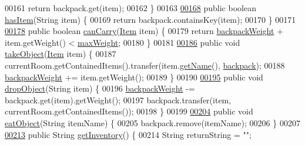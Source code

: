 \begin{DoxyCode}
00161         \textcolor{keywordflow}{return} backpack.get(item);
00162     \}
00163 
\hypertarget{Player_8java_source_l00168}{}\hyperlink{classPlayer_a90cb3f05b491eaed668fe54b9258b755}{00168}     \textcolor{keyword}{public} \textcolor{keywordtype}{boolean} \hyperlink{classPlayer_a90cb3f05b491eaed668fe54b9258b755}{hasItem}(String item) \{
00169         \textcolor{keywordflow}{return} backpack.containsKey(item);
00170     \}
00171 
\hypertarget{Player_8java_source_l00178}{}\hyperlink{classPlayer_ad84aab6c7b6ed8d58608adf0484f0268}{00178}     \textcolor{keyword}{public} \textcolor{keywordtype}{boolean} \hyperlink{classPlayer_ad84aab6c7b6ed8d58608adf0484f0268}{canCarry}(\hyperlink{classItem}{Item} item) \{
00179         \textcolor{keywordflow}{return} \hyperlink{classPlayer_a54523ae912bf972491ace05d3bbcdc79}{backpackWeight} + item.getWeight() < \hyperlink{classPlayer_ad1f36de0de5e6258b92ea5b8eda28edc}{maxWeight};
00180     \}
00181 
\hypertarget{Player_8java_source_l00186}{}\hyperlink{classPlayer_a256305370cf457a32791d68c73e0b236}{00186}     \textcolor{keyword}{public} \textcolor{keywordtype}{void} \hyperlink{classPlayer_a256305370cf457a32791d68c73e0b236}{takeObject}(\hyperlink{classItem}{Item} item) \{
00187         currentRoom.getContainedItems().transfer(item.\hyperlink{classItem_a78dd5a8370c5267c3f1f992167ab84ac}{getName}(), \hyperlink{classPlayer_a33955abef833055b380ec4e9e6ac2e6e}{backpack});
00188         \hyperlink{classPlayer_a54523ae912bf972491ace05d3bbcdc79}{backpackWeight} += item.getWeight();
00189     \}
00190 
\hypertarget{Player_8java_source_l00195}{}\hyperlink{classPlayer_a4fbdbd407197f43f4f7beca517182765}{00195}     \textcolor{keyword}{public} \textcolor{keywordtype}{void} \hyperlink{classPlayer_a4fbdbd407197f43f4f7beca517182765}{dropObject}(String item) \{
00196         \hyperlink{classPlayer_a54523ae912bf972491ace05d3bbcdc79}{backpackWeight} -= backpack.get(item).getWeight();
00197         backpack.transfer(item, currentRoom.getContainedItems());
00198     \}
00199 
\hypertarget{Player_8java_source_l00204}{}\hyperlink{classPlayer_a83141dd7c002b30a6e19b884daf26e8c}{00204}     \textcolor{keyword}{public} \textcolor{keywordtype}{void} \hyperlink{classPlayer_a83141dd7c002b30a6e19b884daf26e8c}{eatObject}(String itemName) \{
00205         backpack.remove(itemName);
00206     \}
00207 
\hypertarget{Player_8java_source_l00213}{}\hyperlink{classPlayer_a5c4667e6eca93d1bba69f7db022f2feb}{00213}     \textcolor{keyword}{public} String \hyperlink{classPlayer_a5c4667e6eca93d1bba69f7db022f2feb}{getInventory}() \{
00214         String returnString = \textcolor{stringliteral}{""};

\end{DoxyCode}
